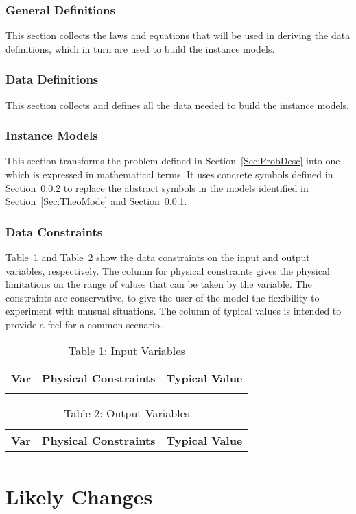 \documentclass[12pt]{article}
\begin{document}
\subsubsection{General Definitions}
\label{Sec:GeneDefi}
This section collects the laws and equations that will be used in deriving the data definitions, which in turn are used to build the instance models.
\subsubsection{Data Definitions}
\label{Sec:DataDefi}
This section collects and defines all the data needed to build the instance models.
\subsubsection{Instance Models}
\label{Sec:InstMode}
This section transforms the problem defined in Section~\ref{Sec:ProbDesc} into one which is expressed in mathematical terms. It uses concrete symbols defined in Section~\ref{Sec:DataDefi} to replace the abstract symbols in the models identified in Section~\ref{Sec:TheoMode} and Section~\ref{Sec:GeneDefi}.
\subsubsection{Data Constraints}
\label{Sec:DataCons}
Table~\ref{Table:Tabl1:InpuVari} and Table~\ref{Table:Tabl2:OutpVari} show the data constraints on the input and output variables, respectively. The column for physical constraints gives the physical limitations on the range of values that can be taken by the variable. The constraints are conservative, to give the user of the model the flexibility to experiment with unusual situations. The column of typical values is intended to provide a feel for a common scenario.
\begin{longtable}{l l l}
\toprule
Var & Physical Constraints & Typical Value
\\
\midrule
\bottomrule
\caption{Table 1: Input Variables}
\label{Table:Tabl1:InpuVari}
\end{longtable}
\begin{longtable}{l l l}
\toprule
Var & Physical Constraints & Typical Value
\\
\midrule
\bottomrule
\caption{Table 2: Output Variables}
\label{Table:Tabl2:OutpVari}
\end{longtable}
\section{Likely Changes}
\label{Sec:LikeChan}
\end{document}
